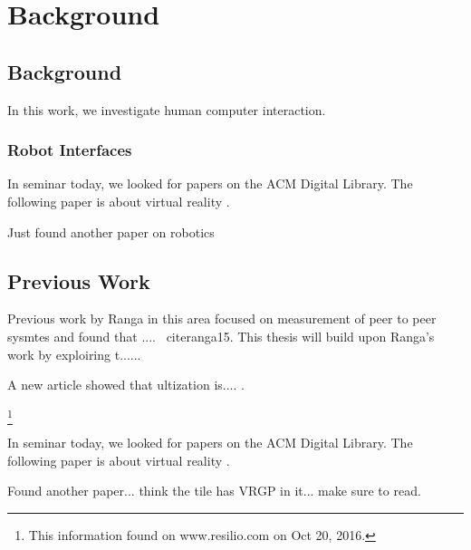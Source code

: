 \chapter{Background}
\label{chap:background}

\section{Background}

In this work, we investigate human computer interaction. 

\subsection{Robot Interfaces}

In seminar today, we looked for papers on the ACM Digital Library. The
following paper is about virtual reality \cite{Kreylos:2006:ESW:1128923.1128948}.

Just found another paper on robotics  \cite{Drascic89}

\section{Previous Work}

Previous work by Ranga in this area focused on measurement of peer to peer sysmtes and found that .... ~cite{ranga15}. This thesis will build upon Ranga's work by exploiring t......

A new article showed that ultization is.... \cite{Abbasi:2013:DBS:2507924.2507961}.

\cite{website1}

\footnote{This information found on www.resilio.com on Oct 20, 2016.}

In seminar today, we looked for papers on the ACM Digital Library. The
following paper is about virtual reality
\cite{Kreylos:2006:ESW:1128923.1128948}.

Found another paper... think the tile has VRGP in it... make sure to read.





